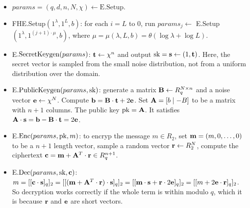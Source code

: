 \documentclass[../main.tex]{subfiles}
\begin{document}









\iffalse 
\begin{itemize}
    \item $params=(q,d,n,N,\chi) \leftarrow \text{E}.\text{Setup}$. 
    \item FHE.Setup$(1^{\lambda},1^L,b)$: for each $i=L$ to 0, run $params_j \leftarrow$ E.Setup$(1^{\lambda},1^{(j+1)\cdot \mu}, b)$, where $\mu=\mu(\lambda,L,b)=\theta(\log \lambda + \log L)$.
    
    \item E$.\text{SecretKeygen}(params)$: $\mathbf{t} \leftarrow \chi^n$ and output $\text{sk}=\mathbf{s}\leftarrow (1,\mathbf{t})$. Here, the secret vector is sampled from the small noise distribution, not from a uniform distribution over the domain. 
    \item E$.\text{PublicKeygen}(params,\text{sk})$: generate a matrix $\mathbf{B} \leftarrow R_q^{N\times n}$ and a noise vector $\mathbf{e} \leftarrow \chi^N$. Compute $\mathbf{b}=\mathbf{B}\cdot \mathbf{t} + 2\mathbf{e}$. Set $\mathbf{A}=[b \mid -B]$ to be a matrix with $n+1$ columns. The public key $\text{pk}=\mathbf{A}$. It satisfies $\mathbf{A} \cdot \mathbf{s} = \mathbf{b} - \mathbf{B} \cdot \mathbf{t} = 2\mathbf{e}$.
    \item E$.\text{Enc}(params,\text{pk},m)$: to encryp the message $m \in R_2$, set $\mathbf{m}=(m,0,\dots,0)$ to be a $n+1$ length vector, sample a random vector $\mathbf{r} \leftarrow R_2^N$, compute the ciphertext $\mathbf{c} = \mathbf{m} + \mathbf{A}^T \cdot \mathbf{r} \in R_q^{n+1}$.
    \item E$.\text{Dec}(params,\text{sk},\mathbf{c})$: $m=[[\mathbf{c} \cdot \mathbf{s}]_q]_2=[[(\mathbf{m}+\mathbf{A}^T\cdot \mathbf{r})\cdot \mathbf{s}]_q]_2=[[\mathbf{m}\cdot \mathbf{s} + \mathbf{r} \cdot 2\mathbf{e}]_q]_2=[[m+2\mathbf{e}\cdot \mathbf{r}]_q]_2$. So decryption works correctly if the whole term is within modulo $q$, which it is because $\mathbf{r}$ and $\mathbf{e}$ are short vectors. 
\end{itemize}
\end{document}
